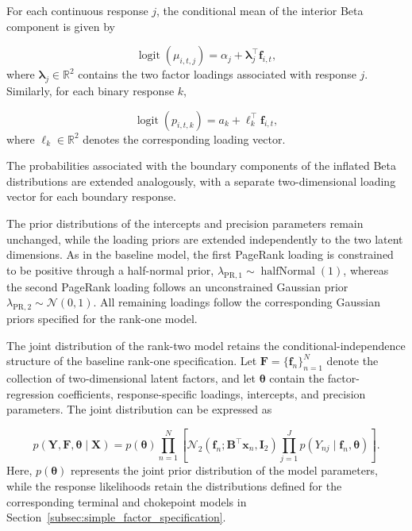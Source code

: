 \documentclass[pdftex,12pt,openright,a4paper,oneside]{book}
\begin{document}
For each continuous response \(j\), the conditional mean of the interior Beta component is given by

\[
\operatorname{logit}(\mu_{i,t,j})
=
\alpha_j+
\boldsymbol\lambda_j^\top\mathbf f_{i,t},
\]
where \(\boldsymbol\lambda_j\in\mathbb R^2\) contains the two factor loadings associated with response \(j\).
Similarly, for each binary response \(k\),

\[
\operatorname{logit}(p_{i,t,k})
=
a_k+
\boldsymbol\ell_k^\top\mathbf f_{i,t},
\]
where \(\boldsymbol\ell_k\in\mathbb R^2\) denotes the corresponding loading vector.

The probabilities associated with the boundary components of the inflated Beta distributions are extended analogously, 
with a separate two-dimensional loading vector for each boundary response.

The prior distributions of the intercepts and precision parameters remain unchanged, while the loading priors 
are extended independently to the two latent dimensions. As in the baseline model, the first PageRank loading is 
constrained to be positive through a half-normal prior, $\lambda_{\mathrm{PR},1}\sim\operatorname{halfNormal}(1)$,
whereas the second PageRank loading follows an unconstrained Gaussian prior $\lambda_{\mathrm{PR},2}\sim\mathcal N(0,1)$.
All remaining loadings follow the corresponding Gaussian priors specified for the rank-one model.

The joint distribution of the rank-two model retains the conditional-independence structure of the baseline rank-one specification. 
Let \(\mathbf F=\{\mathbf f_n\}_{n=1}^{N}\) denote the collection of two-dimensional latent factors, 
and let \(\boldsymbol\theta\) contain the factor-regression coefficients, response-specific loadings, intercepts, and precision parameters. 
The joint distribution can be expressed as

\begin{equation}
p(\mathbf Y,\mathbf F,\boldsymbol\theta\mid\mathbf X)=
p(\boldsymbol\theta)
\prod_{n=1}^{N}
\left[
\mathcal N_2
\left(
\mathbf f_n;
\mathbf B^\top\mathbf x_n,
\mathbf I_2
\right)
\prod_{j=1}^{J}
p(Y_{nj}\mid\mathbf f_n,\boldsymbol\theta)
\right].
\end{equation}
Here, \(p(\boldsymbol\theta)\) represents the joint prior distribution of the model parameters, while the response likelihoods retain the distributions defined for the corresponding terminal and chokepoint models in Section~\ref{subsec:simple_factor_specification}.
\end{document}
